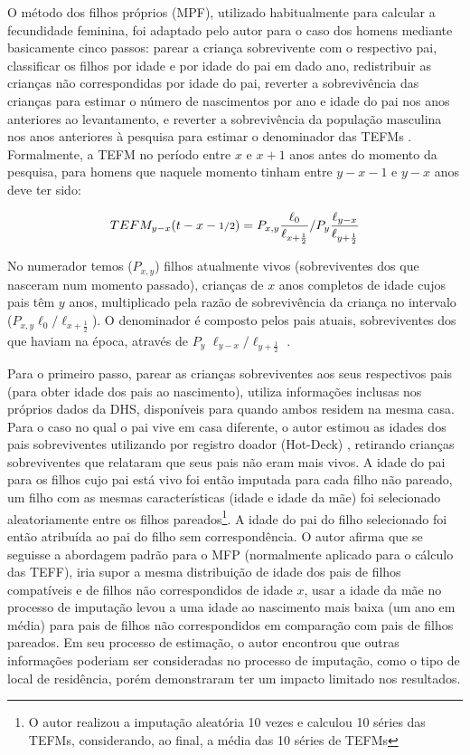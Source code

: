 O método dos filhos próprios (MPF), utilizado habitualmente para calcular a fecundidade feminina, foi adaptado pelo autor para o caso dos homens mediante basicamente cinco passos: parear a criança sobrevivente com o respectivo pai, classificar os filhos por idade e por idade do pai em dado ano, redistribuir as crianças não correspondidas por idade do pai, reverter a sobrevivência das crianças para estimar o número de nascimentos por ano e idade do pai nos anos anteriores ao levantamento, e  reverter a sobrevivência da população masculina nos anos anteriores à pesquisa para estimar o denominador das TEFMs \cite{schoumaker2017measuring}. 
Formalmente, a TEFM no período entre $x$ e $x+1$ anos antes do momento da pesquisa, para homens que naquele momento tinham entre $y-x-1$ e $y-x$ anos deve ter sido: 

\begin{equation}
    TEFM_{y-x}(t-x-\text{\footnotesize1/2})=P_{x,y}\frac{\ell_{0}}{\ell_{x+\frac{1}{2}}} / P_{y}\frac{\ell_{y-x}}{\ell_{y+\frac{1}{2}}}
\end{equation}

No numerador temos ($P_{x,y}$) filhos atualmente vivos (sobreviventes dos que nasceram num momento passado), crianças de $x$ anos completos de idade cujos pais têm $y$ anos, multiplicado pela razão de sobrevivência da criança no intervalo ($P_{x,y} \ell_{0} / \ell_{x+\frac{1}{2}}$). O denominador é composto pelos pais atuais, sobreviventes dos que haviam na época, através de $P_{y}$ $\ell_{y-x} / \ell_{y+\frac{1}{2}}$ \cite{FOZ2021metodos}.  

Para o primeiro passo, parear as crianças sobreviventes aos seus respectivos pais (para obter idade dos pais ao nascimento),  utiliza informações inclusas nos próprios dados da DHS, disponíveis para quando ambos residem na mesma casa. Para o caso no qual o pai vive em casa diferente, o autor estimou as idades dos pais sobreviventes utilizando por registro doador (Hot-Deck) , retirando crianças sobreviventes que relataram que seus pais não eram mais vivos. 
A idade do pai para os filhos cujo pai está vivo foi então imputada para cada filho não pareado, um filho com as mesmas características (idade e idade da mãe) foi selecionado aleatoriamente entre os filhos pareados\footnote{O autor realizou a imputação aleatória 10 vezes e calculou 10 séries das TEFMs, considerando, ao final, a média das 10 séries de TEFMs}.
A idade do pai do filho selecionado foi então atribuída ao pai do filho sem correspondência.
O autor afirma que se seguisse a abordagem padrão para o MFP (normalmente aplicado para o cálculo das TEFF), iria supor a mesma distribuição de idade dos pais de filhos compatíveis e de filhos não correspondidos de idade $x$, usar a idade da mãe no processo de imputação levou a uma idade ao nascimento mais baixa (um ano em média) para pais de filhos não correspondidos em comparação com pais de filhos pareados. Em seu processo de estimação, o autor encontrou que outras informações poderiam ser consideradas no processo de imputação, como o tipo de local de residência, porém demonstraram ter um impacto limitado nos resultados. 

